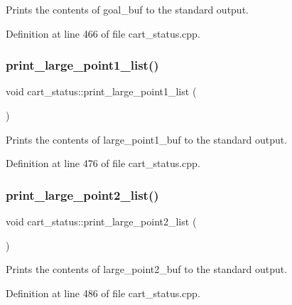 Prints the contents of goal\+\_\+buf to the standard output. 

Definition at line 466 of file cart\+\_\+status.\+cpp.

\mbox{\label{classcart__status_a9decf11bef6e36c350463102401c247e}} 
\subsubsection{\texorpdfstring{print\+\_\+large\+\_\+point1\+\_\+list()}{print\_large\_point1\_list()}}
{\footnotesize\ttfamily void cart\+\_\+status\+::print\+\_\+large\+\_\+point1\+\_\+list (\begin{DoxyParamCaption}{ }\end{DoxyParamCaption})}

Prints the contents of large\+\_\+point1\+\_\+buf to the standard output. 

Definition at line 476 of file cart\+\_\+status.\+cpp.

\mbox{\label{classcart__status_a8a6a9273616bef95c4d0aeccb2524aaa}} 
\subsubsection{\texorpdfstring{print\+\_\+large\+\_\+point2\+\_\+list()}{print\_large\_point2\_list()}}
{\footnotesize\ttfamily void cart\+\_\+status\+::print\+\_\+large\+\_\+point2\+\_\+list (\begin{DoxyParamCaption}{ }\end{DoxyParamCaption})}

Prints the contents of large\+\_\+point2\+\_\+buf to the standard output. 

Definition at line 486 of file cart\+\_\+status.\+cpp.

\mbox{\label{classcart__status_a41b5c0827d3f6c7bd051668dbd37e21a}} 
